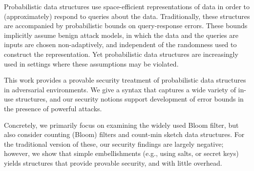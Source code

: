 Probabilistic data structures use space-efficient representations of data in
order to (approximately) respond to queries about the data. 
Traditionally, these structures are accompanied by probabilistic bounds on
query-response errors. These bounds implicitly assume benign attack
models, in which the data and the queries are inputs are chosen
non-adaptively, and independent of the randomness used to
construct the representation. Yet probabilistic data structures are
increasingly used in settings where these assumptions may be violated.

This work provides a provable security treatment of probabilistic data
structures in adversarial environments. We give a syntax that captures a wide
variety of in-use structures, and our security notions support
development of error bounds in the presence of powerful attacks.

Concretely, we primarily focus on examining the widely used Bloom filter, but
also consider counting (Bloom) filters and count-min sketch data structures.
For the traditional version of these, our security findings are largely
negative; however, we show that simple embellishments (e.g., using salts, or
secret keys) yields structures that provide provable security, and with little
overhead.